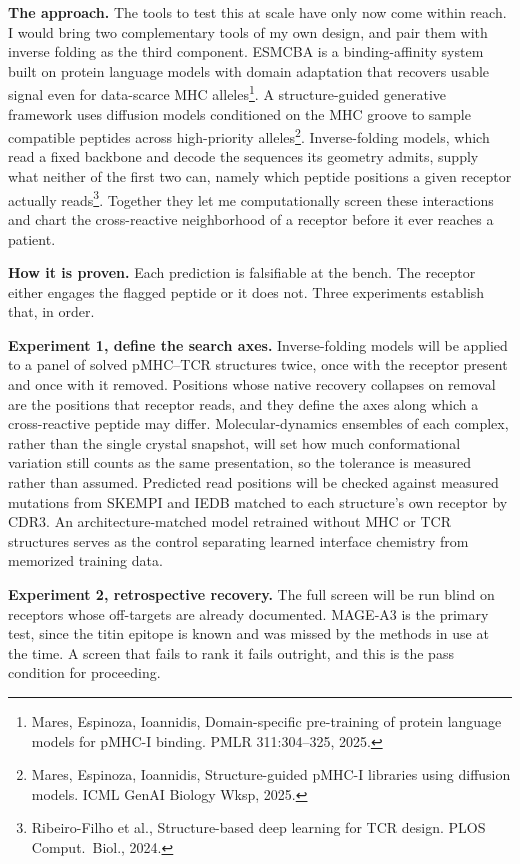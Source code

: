 \documentclass[letterpaper]{article}
\begin{document}
\noindent\textbf{The approach.} The tools to test this at scale have only now come within reach. I would
bring two complementary tools of my own design, and pair them with inverse folding as the third
component. ESMCBA is a binding-affinity system built on protein language models with domain adaptation
that recovers usable signal even for data-scarce MHC alleles\footnote{Mares, Espinoza, Ioannidis,
Domain-specific pre-training of protein language models for pMHC-I binding. PMLR 311:304--325, 2025.}. A
structure-guided generative framework uses diffusion models conditioned on the MHC groove to sample
compatible peptides across high-priority alleles\footnote{Mares, Espinoza, Ioannidis, Structure-guided
pMHC-I libraries using diffusion models. ICML GenAI Biology Wksp, 2025.}. Inverse-folding models, which
read a fixed backbone and decode the sequences its geometry admits, supply what neither of the first two
can, namely which peptide positions a given receptor actually reads\footnote{Ribeiro-Filho et al.,
Structure-based deep learning for TCR design. PLOS Comput.\ Biol., 2024.}. Together they let me
computationally screen these interactions and chart the cross-reactive neighborhood of a receptor before
it ever reaches a patient.

\noindent\textbf{How it is proven.} Each prediction is falsifiable at the bench. The receptor either
engages the flagged peptide or it does not. Three experiments establish that, in order.

\noindent\textbf{Experiment 1, define the search axes.} Inverse-folding models will be applied to a panel
of solved pMHC--TCR structures twice, once with the receptor present and once with it removed. Positions
whose native recovery collapses on removal are the positions that receptor reads, and they define the
axes along which a cross-reactive peptide may differ. Molecular-dynamics ensembles of each complex,
rather than the single crystal snapshot, will set how much conformational variation still counts as the
same presentation, so the tolerance is measured rather than assumed. Predicted read positions will be
checked against measured mutations from SKEMPI and IEDB matched to each structure's own receptor by CDR3.
An architecture-matched model retrained without MHC or TCR structures serves as the control separating
learned interface chemistry from memorized training data.

\noindent\textbf{Experiment 2, retrospective recovery.} The full screen will be run blind on receptors
whose off-targets are already documented. MAGE-A3 is the primary test, since the titin epitope is known
and was missed by the methods in use at the time. A screen that fails to rank it fails outright, and this
is the pass condition for proceeding.
\end{document}
